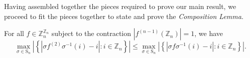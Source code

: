 Having assembled together the pieces required to prove our main result, we proceed to fit the pieces together to state and prove the \textit{Composition Lemma}.
\begin{lemma}\label{lem:composition-lemma}
 For all $f\in\mathbb{Z}_{n}^{\mathbb{Z}_{n}}$ subject to the contraction
$\left|f^{\left(n-1\right)}\left(\mathbb{Z}_{n}\right)\right|=1$,
we have
\begin{equation}\label{eq:composition-lemma}
\max_{\sigma\in\text{S}_{n}}\left|\left\{ \left|\sigma f^{(2)}\sigma^{-1}(i)-i\right|:i\in\mathbb{Z}_{n}\right\} \right|\le\max_{\sigma\in\text{S}_{n}}\left|\left\{ \left|\sigma f\sigma^{-1}(i)-i\right|:i\in\mathbb{Z}_{n}\right\} \right|.\end{equation}
\end{lemma}
